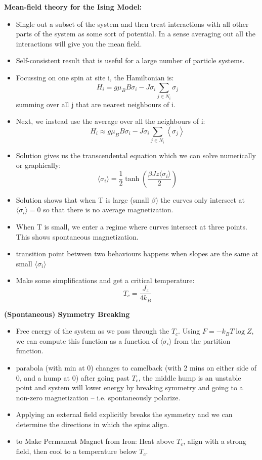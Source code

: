\textbf{Mean-field theory for the Ising Model:}
\begin{itemize}
    \item Single out a subset of the system and then treat interactions with all other parts of the system as some sort of potential. In a sense averaging out all the interactions will give you the mean field.
    \item Self-consistent result that is useful for a large number of particle systems.
    \item Focussing on one spin at site i, the Hamiltonian is:
    \[H_{i} = g \mu_B B \sigma_i - J \sigma_i \sum_{j\in N_i} \sigma_j\]
    summing over all j that are nearest neighbours of i.
    \item Next, we instead use the average over all the neighbours of i:
    \[H_{i} \approx g \mu_B B \sigma_i - J \sigma_i \sum_{j\in N_i} \left<\sigma_j\right>\]
    \item Solution gives us the transcendental equation which we can solve numerically or graphically:
    \[\langle\sigma_i\rangle = \frac{1}{2} \tanh \left(\frac{ \beta J z \langle\sigma_i\rangle}{2}\right)\]
    \item Solution shows that when T is large (small $\beta$) the curves only intersect at $\langle\sigma_i\rangle=0$ so that there is no average magnetization. 
    \item When T is small, we enter a regime where curves intersect at three points. This shows spontaneous magnetization.
    \item transition point between two behaviours happens when slopes are the same at small $\langle\sigma_i\rangle$
    \item Make some simplifications and get a critical temperature:
    \[T_c = \frac{J_z}{4k_B}\]
\end{itemize}

\textbf{(Spontaneous) Symmetry Breaking}
\begin{itemize}
    \item Free energy of the system as we pass through the $T_c$. Using $F = -k_B T \log Z$, we can compute this function as a function of $\langle \sigma_i\rangle$ from the partition function.
    \item parabola (with min at 0) changes to camelback (with 2 mins on either side of 0, and a hump at 0) after going past $T_c$, the middle hump is an unstable point and system will lower energy by breaking symmetry and going to a non-zero magnetization -- i.e. spontaneously polarize.
    \item Applying an external field explicitly breaks the symmetry and we can determine  the directions in which the spins align.
    \item to Make Permanent Magnet from Iron: Heat above $T_c$, align with a strong field, then cool to a temperature below $T_c$.
\end{itemize}

